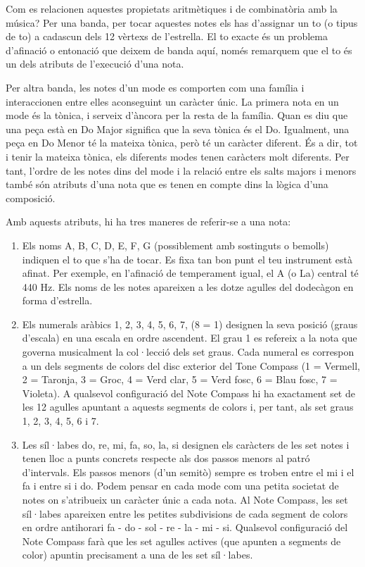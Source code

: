 Com es relacionen aquestes propietats aritmètiques i de combinatòria amb la música? Per una banda, per tocar aquestes notes els has d'assignar un to (o tipus de to) a cadascun dels 12 vèrtexs de l'estrella. El to exacte és un problema d'afinació o entonació que deixem de banda aquí, només remarquem que el to és un dels atributs de l'execució d'una nota.

Per  altra banda, les notes d'un mode es comporten com una família i interaccionen entre elles aconseguint un caràcter únic. La primera nota en un mode és la tònica, i serveix d'àncora per la resta de la família. Quan es diu que una peça està en Do Major significa que la seva tònica és el Do. Igualment, una peça en Do Menor té la mateixa tònica, però té un caràcter diferent. És a dir, tot i tenir la mateixa tònica, els diferents modes tenen caràcters molt diferents. Per tant, l'ordre de les notes dins del mode i la relació entre els salts majors i menors també són atributs d'una nota que es tenen en compte dins la lògica d'una composició.


Amb aquests atributs, hi ha tres maneres de referir-se a una nota:

\begin{enumerate}

\item Els noms A, B, C, D, E, F, G (possiblement amb sostinguts o bemolls) indiquen el to que s'ha de tocar. Es fixa tan bon punt el teu instrument està afinat. Per exemple, en l'afinació de temperament igual, el A (o La) central té 440 Hz. Els noms de les notes apareixen a les dotze agulles del dodecàgon en forma d'estrella.

\item Els numerals aràbics 1, 2, 3, 4, 5, 6, 7, (8 = 1) designen la seva posició (graus d'escala) en una escala en ordre ascendent. El grau 1 es refereix a la nota que governa musicalment la col·lecció dels set graus.  Cada numeral es correspon a un dels segments de colors del disc exterior del Tone Compass (1 = Vermell, 2 = Taronja, 3 = Groc, 4 = Verd clar, 5 = Verd fosc, 6 = Blau fosc, 7 = Violeta). A qualsevol configuració del Note Compass hi ha exactament set de les 12 agulles apuntant a aquests segments de colors i, per tant, als set graus 1, 2, 3, 4, 5, 6 i 7.

\item Les síl·labes do, re, mi, fa, so, la, si designen els caràcters de les set notes i tenen lloc a punts concrets respecte als dos passos menors al patró d'intervals. Els passos menors (d'un semitò) sempre es troben entre el mi i el fa i entre si i do. Podem pensar en cada mode com una petita societat de notes on s'atribueix un caràcter únic a cada nota. Al Note Compass, les set síl·labes apareixen entre les petites subdivisions de cada segment de colors en ordre antihorari fa - do - sol - re - la - mi - si. Qualsevol configuració del Note Compass farà que les set agulles actives (que apunten a segments de color) apuntin precisament a una de les set síl·labes.

\end{enumerate}


